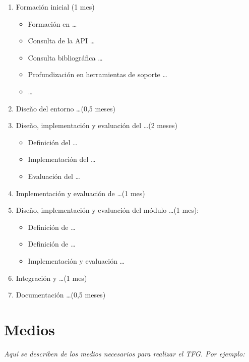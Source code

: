 \documentclass[11pt,a4paper,oneside]{article}
\begin{document}
\begin{enumerate}
  
\item Formación inicial (1 mes)
  
  \begin{itemize}
  \item Formación en \ldots
  \item Consulta de la API \ldots
  \item Consulta bibliográfica \ldots
  \item Profundización en herramientas de soporte \ldots
  \item  \ldots
  \end{itemize}

\item Diseño del entorno \ldots (0,5 meses)

\item Diseño, implementación y evaluación del  \ldots (2 meses)
  \begin{itemize}
  \item Definición del  \ldots
  \item Implementación del  \ldots
  \item Evaluación del  \ldots
  \end{itemize}
  
\item Implementación y evaluación de  \ldots (1 mes)

\item Diseño, implementación y evaluación del módulo  \ldots (1 mes):
  \begin{itemize}
  \item Definición de  \ldots
  \item Definición de  \ldots
  \item Implementación y evaluación  \ldots
  \end{itemize}

\item Integración y  \ldots (1 mes)

\item Documentación  \ldots (0,5 meses)

\end{enumerate}


\section{Medios}
\label{sec:medios}

\textit{Aquí se describen de los medios necesarios para realizar el TFG. Por
ejemplo:}
\end{document}
